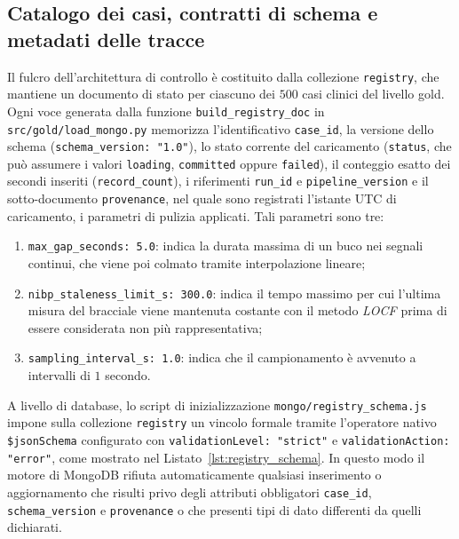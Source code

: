 \subsection{Catalogo dei casi, contratti di schema e metadati delle tracce}
Il fulcro dell'architettura di controllo \`e costituito dalla collezione \texttt{registry}, che mantiene un documento di stato per ciascuno dei $500$ casi clinici del livello gold. Ogni voce generata dalla funzione \texttt{build\_registry\_doc} in \texttt{src/gold/load\_mongo.py} memorizza l'identificativo \texttt{case\_id}, la versione dello schema (\texttt{schema\_version: "1.0"}), lo stato corrente del caricamento (\texttt{status}, che pu\`o assumere i valori \texttt{loading}, \texttt{committed} oppure \texttt{failed}), il conteggio esatto dei secondi inseriti (\texttt{record\_count}), i riferimenti \texttt{run\_id} e \texttt{pipeline\_version} e il sotto-documento \texttt{provenance}, nel quale sono registrati l'istante UTC di caricamento, i parametri di pulizia applicati.  Tali parametri sono tre:
 \begin{enumerate}
  \item \texttt{max\_gap\_seconds: 5.0}: indica la durata massima di un buco nei segnali continui, che viene poi colmato tramite interpolazione lineare;
  \item \texttt{nibp\_staleness\_limit\_s: 300.0}: indica il tempo massimo per cui l'ultima misura del bracciale viene mantenuta costante con il metodo \textit{LOCF} prima di essere considerata non pi\`u rappresentativa;
  \item \texttt{sampling\_interval\_s: 1.0}: indica che il campionamento \`e avvenuto a intervalli di $1$ secondo.
\end{enumerate}

A livello di database, lo script di inizializzazione \texttt{mongo/registry\_schema.js} impone sulla collezione \texttt{registry} un vincolo formale tramite l'operatore nativo \texttt{\$jsonSchema} configurato con \texttt{validationLevel: "strict"} e \texttt{validationAction: "error"}, come mostrato nel Listato~\ref{lst:registry_schema}. In questo modo il motore di MongoDB rifiuta automaticamente qualsiasi inserimento o aggiornamento che risulti privo degli attributi obbligatori \texttt{case\_id}, \texttt{schema\_version} e \texttt{provenance} o che presenti tipi di dato differenti da quelli dichiarati.
\FloatBarrier

